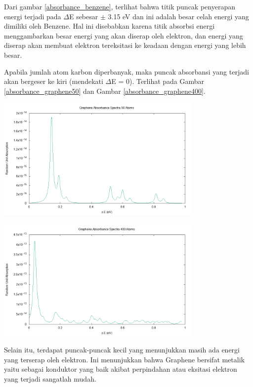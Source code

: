 \documentclass[12pt,a4paper]{report}
\begin{document}
Dari gambar \ref{absorbance_benzene}, terlihat bahwa titik puncak penyerapan energi terjadi pada $\Delta$E sebesar $\pm$ 3.15 eV dan ini adalah besar celah energi yang dimiliki oleh Benzene. Hal ini disebabkan karena titik absorbsi energi menggambarkan besar energi yang akan diserap oleh elektron, dan energi yang diserap akan membuat elektron tereksitasi ke keadaan dengan energi yang lebih besar.

Apabila jumlah atom karbon diperbanyak, maka puncak absorbansi yang terjadi akan bergeser ke kiri (mendekati $\Delta$E = 0). Terlihat pada Gambar \ref{absorbance_graphene50} dan Gambar \ref{absorbance_graphene400}.
\begin{center}
	\includegraphics[width=10cm]{gambar/spectra-graphene50.png}
	\label{absorbance_graphene50}
\end{center}
\begin{center}
	\includegraphics[width=10cm]{gambar/spectra-graphene400.png}
	\label{absorbance_graphene400}
\end{center}

Selain itu, terdapat puncak-puncak kecil yang menunjukkan masih ada energi yang terserap oleh elektron. Ini menunjukkan bahwa Graphene bersifat metalik yaitu sebagai konduktor yang baik akibat perpindahan atau eksitasi elektron yang terjadi sangatlah mudah.
\end{document}
